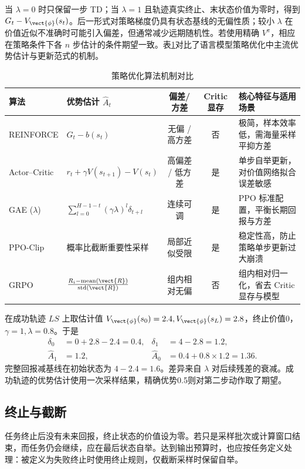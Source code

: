 \documentclass[../textbook.tex]{subfiles}
\begin{document}
当 $\lambda=0$ 时只保留一步 TD；当 $\lambda=1$ 且轨迹真实终止、末状态价值为零时，得到 $G_t-V_{\vect{\phi}}(s_t)$。后一形式对策略梯度仍具有状态基线的无偏性质；较小 $\lambda$ 在价值近似不准确时可能引入偏差，但通常减少远期随机性。若使用精确 $V^\pi$，相应在策略条件下各 $n$ 步估计的条件期望一致。表\ref{tab:advantage-comparison}对比了语言模型策略优化中主流优势估计与更新范式的机制。

\begin{table}[htbp]
\centering
\small
\setlength{\tabcolsep}{3.5pt}
\caption{策略优化算法机制对比}
\label{tab:advantage-comparison}
\begin{tabularx}{\linewidth}{lp{24mm}ccX}
\toprule
算法 & 优势估计 $\widehat A_t$ & 偏差/方差 & Critic 显存 & 核心特征与适用场景 \\
\midrule
REINFORCE & $G_t - b(s_t)$ & 无偏 / 高方差 & 否 & 极简，样本效率低，需海量采样平抑方差 \\
Actor--Critic & $r_t + \gamma V(s_{t+1}) - V(s_t)$ & 高偏差 / 低方差 & 是 & 单步自举更新，对价值网络拟合误差敏感 \\
GAE ($\lambda$) & $\sum_{l=0}^{H-1-t} (\gamma\lambda)^l \delta_{t+l}$ & 连续可调 & 是 & PPO 标准配置，平衡长期回报与方差 \\
PPO-Clip & 概率比截断重要性采样 & 局部近似受限 & 是 & 稳定性高，防止策略单步更新过大崩溃 \\
GRPO & $\frac{R_i - \operatorname{mean}(\vect{R})}{\operatorname{std}(\vect{R})}$ & 组内相对无偏 & 否 & 组内相对归一化，省去 Critic 显存与模型 \\
\bottomrule
\end{tabularx}
\end{table}

\begin{example}


在成功轨迹 $LS$ 上取估计值 $V_{\vect{\phi}}(s_0)=2.4,V_{\vect{\phi}}(s_L)=2.8$，终止价值0，$\gamma=1,\lambda=0.8$。于是
\begin{align*}
 \delta_0 &= 0+2.8-2.4=0.4, & \delta_1 &= 4-2.8=1.2, \\
 \widehat A_1 &= 1.2, & \widehat A_0 &= 0.4+0.8\times1.2=1.36.
\end{align*}
完整回报减基线在初始状态为 $4-2.4=1.6$。差异来自 $\lambda$ 对后续残差的衰减。成功轨迹的优势估计使用一次采样结果，精确优势0.5则对第二步动作取了期望。
\end{example}

\subsection{终止与截断}
任务终止后没有未来回报，终止状态的价值设为零。若只是采样批次或计算窗口结束，而任务仍会继续，应在最后状态自举。达到输出预算时，也应按任务定义处理：被定义为失败终止时使用终止规则，仅截断采样时保留自举。
\end{document}
